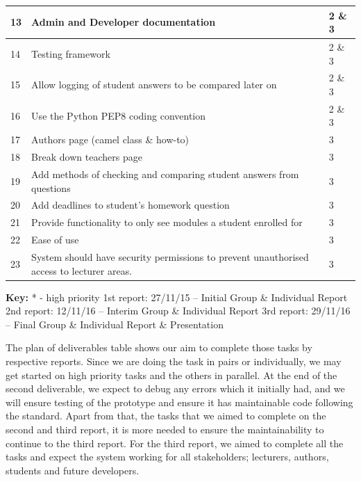 \documentclass[12pt]{article}
\begin{document}
\begin{longtable}{|*{3}{p{3cm}|}}
			13 & Admin and Developer documentation & 2 \& 3 \\
			\midrule
			
			14 & Testing framework  & 2 \& 3 \\
			\midrule
			
			15 & Allow logging of student answers to be compared later on & 2 \& 3 \\
			\midrule
			
			16 & Use the Python PEP8 coding convention & 2 \& 3 \\
			\midrule
			
			17 & Authors page (camel class \& how-to) & 3 \\
			\midrule
			
			18 & Break down teachers page & 3 \\
			\midrule
			
			19 & Add methods of checking and comparing student answers from questions & 3 \\
			\midrule
			
			20 & Add deadlines to student’s homework question  & 3 \\
			\midrule
			
			21 & Provide functionality to only see modules a student enrolled for & 3 \\
			\midrule
			
			22 & Ease of use & 3 \\
			\midrule
			
			23 & System should have security permissions to prevent unauthorised access to lecturer areas. & 3 \\
			\midrule
			
			\bottomrule
		\end{longtable}
		
		\textbf{Key:} *  -  high priority
		1st report: 27/11/15 – Initial Group \& Individual Report
		2nd report: 12/11/16 – Interim Group \& Individual Report
		3rd report: 29/11/16 – Final Group \& Individual Report \& Presentation
		
		The plan of deliverables table shows our aim to complete those tasks by respective reports. Since we are doing the task in pairs or individually, we may get started on high priority tasks and the others in parallel. At the end of the second deliverable, we expect to debug any errors which it initially had, and we will ensure testing of the prototype and ensure it has maintainable code following the standard. Apart from that, the tasks that we aimed to complete on the second and third report, it is more needed to ensure the maintainability to continue to the third report. For the third report, we aimed to complete all the tasks and expect the system working for all stakeholders; lecturers, authors, students and future developers. 
	
\end{document}

